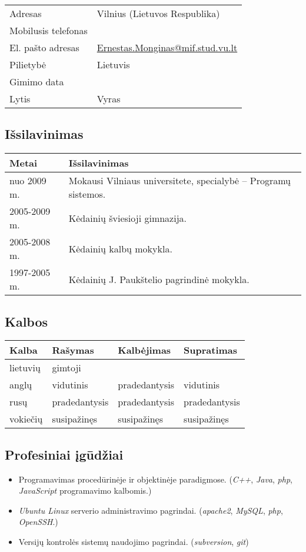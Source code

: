 \begin{tabular}[]{p{3cm} | p{8cm}}
  Adresas & Vilnius (Lietuvos Respublika) \\
  Mobilusis telefonas & \\
  El. pašto adresas & \url{Ernestas.Monginas@mif.stud.vu.lt} \\
  Pilietybė & Lietuvis \\
  Gimimo data & \\
  Lytis & Vyras \\
\end{tabular}

\subsection{Išsilavinimas}

\begin{tabular}[]{p{3cm} | p{8cm}}
  Metai & Išsilavinimas \\
  \hline
  nuo 2009 m. & Mokausi Vilniaus universitete, 
    specialybė – Programų sistemos. \\
  2005-2009 m. & Kėdainių šviesioji gimnazija.\\
  2005-2008 m. & Kėdainių kalbų mokykla. \\
  1997-2005 m. & Kėdainių J. Paukštelio pagrindinė mokykla. \\
\end{tabular}

\subsection{Kalbos}

\begin{tabular}[]{p{3cm} | p{2.5cm} p{2.5cm} p{2.0cm}}
  Kalba & Rašymas & Kalbėjimas & Supratimas \\
  \hline
  lietuvių & gimtoji && \\
  anglų & vidutinis & pradedantysis & vidutinis \\
  rusų & pradedantysis & pradedantysis & pradedantysis \\
  vokiečių & susipažinęs & susipažinęs & susipažinęs \\
\end{tabular}

\subsection{Profesiniai įgūdžiai}

\begin{itemize}
  \item Programavimas procedūrinėje ir objektinėje paradigmose. 
    (\emph{C++}, \emph{Java}, \emph{php}, \emph{JavaScript} 
    programavimo kalbomis.)
  \item \emph{Ubuntu Linux} serverio administravimo pagrindai. 
    (\emph{apache2}, \emph{MySQL}, \emph{php}, 
    \emph{OpenSSH}.)
  \item Versijų kontrolės sistemų naudojimo pagrindai. 
    (\emph{subversion}, \emph{git})
\end{itemize}

